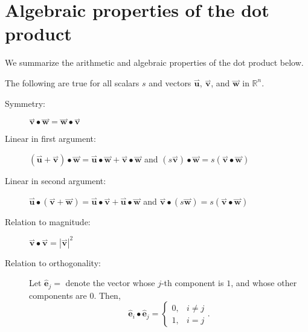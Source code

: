 \documentclass{ximera}
\begin{document}
\section{Algebraic properties of the dot product}
We summarize the arithmetic and algebraic properties of the dot
product below.
\begin{theorem}
  The following are true for all scalars $s$ and vectors
  $\overset{\boldsymbol{\rightharpoonup}}{\mathbf{u}}$, $\overset{\boldsymbol{\rightharpoonup}}{\mathbf{v}}$, and $\overset{\boldsymbol{\rightharpoonup}}{\mathbf{w}}$ in $\mathbb{R}^n$.
  \begin{description}
  \item[Symmetry:] $\overset{\boldsymbol{\rightharpoonup}}{\mathbf{v}} \bullet \overset{\boldsymbol{\rightharpoonup}}{\mathbf{w}} = \overset{\boldsymbol{\rightharpoonup}}{\mathbf{w}} \bullet
    \overset{\boldsymbol{\rightharpoonup}}{\mathbf{v}}$
  \item[Linear in first argument:] $(\overset{\boldsymbol{\rightharpoonup}}{\mathbf{u}}+\overset{\boldsymbol{\rightharpoonup}}{\mathbf{v}})\bullet \overset{\boldsymbol{\rightharpoonup}}{\mathbf{w}} = \overset{\boldsymbol{\rightharpoonup}}{\mathbf{u}} \bullet \overset{\boldsymbol{\rightharpoonup}}{\mathbf{w}} +
    \overset{\boldsymbol{\rightharpoonup}}{\mathbf{v}} \bullet \overset{\boldsymbol{\rightharpoonup}}{\mathbf{w}}$ and $(s\overset{\boldsymbol{\rightharpoonup}}{\mathbf{v}}) \bullet \overset{\boldsymbol{\rightharpoonup}}{\mathbf{w}} = s(\overset{\boldsymbol{\rightharpoonup}}{\mathbf{v}}
    \bullet \overset{\boldsymbol{\rightharpoonup}}{\mathbf{w}})$
  \item[Linear in second argument:] $\overset{\boldsymbol{\rightharpoonup}}{\mathbf{u}} \bullet (\overset{\boldsymbol{\rightharpoonup}}{\mathbf{v}}+\overset{\boldsymbol{\rightharpoonup}}{\mathbf{w}}) = \overset{\boldsymbol{\rightharpoonup}}{\mathbf{u}} \bullet \overset{\boldsymbol{\rightharpoonup}}{\mathbf{v}}+
    \overset{\boldsymbol{\rightharpoonup}}{\mathbf{u}} \bullet \overset{\boldsymbol{\rightharpoonup}}{\mathbf{w}}$ and $\overset{\boldsymbol{\rightharpoonup}}{\mathbf{v}} \bullet (s\overset{\boldsymbol{\rightharpoonup}}{\mathbf{w}}) = s(\overset{\boldsymbol{\rightharpoonup}}{\mathbf{v}}
    \bullet \overset{\boldsymbol{\rightharpoonup}}{\mathbf{w}})$
  \item[Relation to magnitude:] $\overset{\boldsymbol{\rightharpoonup}}{\mathbf{v}} \bullet \overset{\boldsymbol{\rightharpoonup}}{\mathbf{v}} = |\overset{\boldsymbol{\rightharpoonup}}{\mathbf{v}}|^2$
  \item[Relation to orthogonality:]  Let $\mathbf{\hat{e}}_j =$ denote the vector whose $j$-th component is $1$, and whose other components are $0$. Then, \[\mathbf{\hat{e}}_i \bullet \mathbf{\hat{e}}_j = \left\{ \begin{array}{ll} 0, & i \neq j \\ 1, & i=j \end{array}\right. . \]
  \end{description}
\end{theorem}
\end{document}
